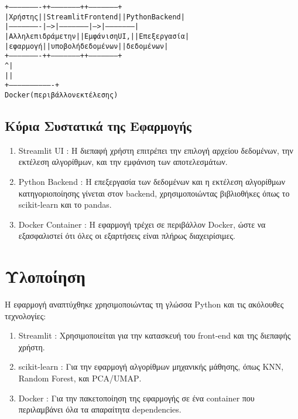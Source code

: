 \documentclass[a4paper,12pt]{article}
\begin{document}
\begin{alltt}
\scriptsize
+----------------------+        +--------------------+          +--------------------+
|      Χρήστης          |       |  \textlatin{Streamlit Frontend}|               |\textlatin{Python Backend} |
|----------------------|  --->  |--------------------|   --->   |--------------------|
| Αλληλεπιδρά με την    |        |  Εμφάνιση\textlatin{ UI,}              |     | Επεξεργασία   |
| εφαρμογή             |        |  υποβολή δεδομένων  |            |  δεδομένων       |
+----------------------+        +--------------------+          +--------------------+
                                        ^                               |
                                        |                               |
                                        +-------------------------------+
                                         \textlatin{Docker} (περιβάλλον εκτέλεσης)
\end{alltt}

\subsection{Κύρια Συστατικά της Εφαρμογής}
\begin{enumerate}

\item\textlatin{Streamlit UI}  : Η διεπαφή χρήστη επιτρέπει την επιλογή αρχείου δεδομένων, την εκτέλεση αλγορίθμων, και την εμφάνιση των αποτελεσμάτων.
\item\textlatin{Python Backend}  : Η επεξεργασία των δεδομένων και η εκτέλεση αλγορίθμων κατηγοριοποίησης γίνεται στον \textlatin{backend}, χρησιμοποιώντας βιβλιοθήκες όπως το \textlatin{scikit-learn} και το \textlatin{pandas}.
\item\textlatin{Docker Container}  : Η εφαρμογή τρέχει σε περιβάλλον \textlatin{Docker}, ώστε να εξασφαλιστεί ότι όλες οι εξαρτήσεις είναι πλήρως διαχειρίσιμες.
\end{enumerate}

\section{Υλοποίηση}

Η εφαρμογή αναπτύχθηκε χρησιμοποιώντας τη γλώσσα \textlatin{Python} και τις ακόλουθες τεχνολογίες:
\begin{enumerate}

\item\textlatin{Streamlit}  : Χρησιμοποιείται για την κατασκευή του \textlatin{front-end} και της διεπαφής χρήστη.
\item\textlatin{scikit-learn}  : Για την εφαρμογή αλγορίθμων μηχανικής μάθησης, όπως \textlatin{KNN}, \textlatin{Random Forest}, και \textlatin{PCA}/\textlatin{UMAP}.
\item\textlatin{Docker}  : Για την πακετοποίηση της εφαρμογής σε ένα \textlatin{container} που περιλαμβάνει όλα τα απαραίτητα \textlatin{dependencies}.
\end{enumerate}
\end{document}
